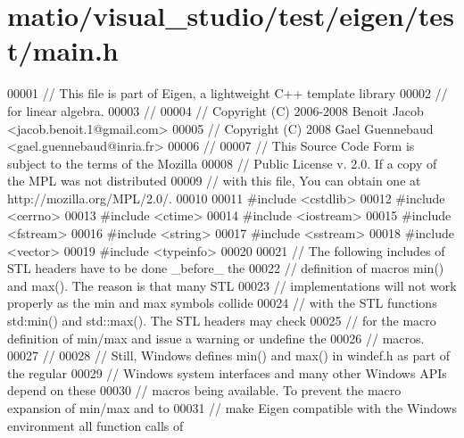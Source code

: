 \hypertarget{matio_2visual__studio_2test_2eigen_2test_2main_8h_source}{}\section{matio/visual\+\_\+studio/test/eigen/test/main.h}
\label{matio_2visual__studio_2test_2eigen_2test_2main_8h_source}

\begin{DoxyCode}
00001 \textcolor{comment}{// This file is part of Eigen, a lightweight C++ template library}
00002 \textcolor{comment}{// for linear algebra.}
00003 \textcolor{comment}{//}
00004 \textcolor{comment}{// Copyright (C) 2006-2008 Benoit Jacob <jacob.benoit.1@gmail.com>}
00005 \textcolor{comment}{// Copyright (C) 2008 Gael Guennebaud <gael.guennebaud@inria.fr>}
00006 \textcolor{comment}{//}
00007 \textcolor{comment}{// This Source Code Form is subject to the terms of the Mozilla}
00008 \textcolor{comment}{// Public License v. 2.0. If a copy of the MPL was not distributed}
00009 \textcolor{comment}{// with this file, You can obtain one at http://mozilla.org/MPL/2.0/.}
00010 
00011 \textcolor{preprocessor}{#include <cstdlib>}
00012 \textcolor{preprocessor}{#include <cerrno>}
00013 \textcolor{preprocessor}{#include <ctime>}
00014 \textcolor{preprocessor}{#include <iostream>}
00015 \textcolor{preprocessor}{#include <fstream>}
00016 \textcolor{preprocessor}{#include <string>}
00017 \textcolor{preprocessor}{#include <sstream>}
00018 \textcolor{preprocessor}{#include <vector>}
00019 \textcolor{preprocessor}{#include <typeinfo>}
00020 
00021 \textcolor{comment}{// The following includes of STL headers have to be done \_before\_ the}
00022 \textcolor{comment}{// definition of macros min() and max().  The reason is that many STL}
00023 \textcolor{comment}{// implementations will not work properly as the min and max symbols collide}
00024 \textcolor{comment}{// with the STL functions std:min() and std::max().  The STL headers may check}
00025 \textcolor{comment}{// for the macro definition of min/max and issue a warning or undefine the}
00026 \textcolor{comment}{// macros.}
00027 \textcolor{comment}{//}
00028 \textcolor{comment}{// Still, Windows defines min() and max() in windef.h as part of the regular}
00029 \textcolor{comment}{// Windows system interfaces and many other Windows APIs depend on these}
00030 \textcolor{comment}{// macros being available.  To prevent the macro expansion of min/max and to}
00031 \textcolor{comment}{// make Eigen compatible with the Windows environment all function calls of}

\end{DoxyCode}
